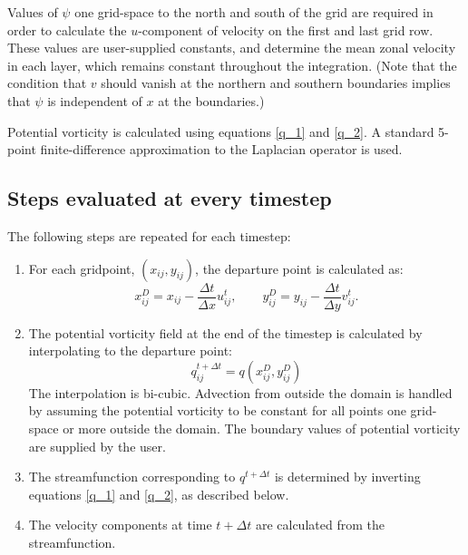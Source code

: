 \documentclass[12pt]{article}
\begin{document}
Values of $\psi$ one grid-space to the north and south of the grid are
required in order to calculate the $u$-component of velocity on the
first and last grid row. These values are user-supplied constants,
and determine the mean zonal velocity in each layer, which remains
constant throughout the integration. (Note that the condition that
$v$ should vanish at the northern and southern boundaries implies
that $\psi$ is independent of $x$ at the boundaries.)

Potential vorticity is calculated using equations
\ref{q_1} and \ref{q_2}. A standard 5-point finite-difference
approximation to the Laplacian operator is used.

\subsection{Steps evaluated at every timestep}

The following steps are repeated for each timestep:

\begin{enumerate}
\item For each gridpoint, $(x_{ij} ,y_{ij})$, the departure point is
calculated as:
\begin{equation}
  x^D_{ij} = x_{ij} - \frac{\Delta t}{\Delta x} u^t_{ij} ,\qquad
  y^D_{ij} = y_{ij} - \frac{\Delta t}{\Delta y} v^t_{ij} .
\end{equation}

\item The potential vorticity field at the end of the timestep is
calculated by interpolating to the departure point:
\begin{equation}
  q^{t+\Delta t}_{ij} = q(x^D_{ij}, y^D_{ij})
\end{equation}
The interpolation is bi-cubic. Advection from outside the domain is
handled by assuming the potential vorticity to be constant for all
points one grid-space or more outside the domain.
The boundary values of potential vorticity are supplied by the user.

\item The streamfunction corresponding to $q^{t+\Delta t}$ is determined
by inverting equations \ref{q_1} and \ref{q_2}, as described below. 

\item The velocity components at time $t+\Delta t$ are calculated from
the streamfunction.
\end{enumerate}
\end{document}
